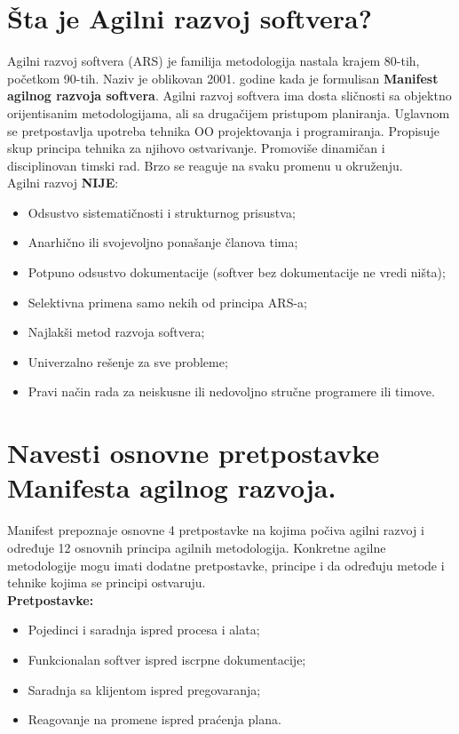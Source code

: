 \documentclass[a4paper]{article}
\begin{document}
\section{Šta je Agilni razvoj softvera?}
  Agilni razvoj softvera (ARS) je familija metodologija nastala krajem 80-tih, početkom 90-tih.
  Naziv je oblikovan 2001. godine kada je formulisan \textbf{Manifest agilnog razvoja softvera}. 
  Agilni  razvoj softvera ima dosta sličnosti sa objektno orijentisanim metodologijama, ali sa
  drugačijem pristupom planiranja. Uglavnom se pretpostavlja upotreba tehnika OO projektovanja i
  programiranja. Propisuje skup principa tehnika za njihovo ostvarivanje. Promoviše dinamičan 
  i disciplinovan timski rad. Brzo se reaguje na svaku promenu u okruženju.
  \cite{agilemanifesto}\cite{ss_agile_manifesto}\\
  Agilni razvoj \textbf{NIJE}:
  \begin{itemize}
    \item Odsustvo sistematičnosti i strukturnog prisustva;
    \item Anarhično ili svojevoljno ponašanje članova tima;
    \item Potpuno odsustvo dokumentacije (softver bez dokumentacije ne vredi ništa);
    \item Selektivna primena samo nekih od principa ARS-a;
    \item Najlakši metod razvoja softvera;
    \item Univerzalno rešenje za sve probleme;
    \item Pravi način rada za neiskusne ili nedovoljno stručne programere ili timove.
  \end{itemize}

\section{Navesti osnovne pretpostavke Manifesta agilnog razvoja.}
  Manifest prepoznaje osnovne 4 pretpostavke na kojima počiva agilni razvoj i određuje 12 osnovnih
  principa agilnih metodologija. Konkretne agilne metodologije mogu imati dodatne pretpostavke, 
  principe i da određuju metode i tehnike kojima se principi ostvaruju. \\
  \textbf{Pretpostavke:}
  \begin{itemize}
    \item Pojedinci i saradnja ispred procesa i alata;
    \item Funkcionalan softver ispred iscrpne dokumentacije;
    \item Saradnja sa klijentom ispred pregovaranja;
    \item Reagovanje na promene ispred praćenja plana.
  \end{itemize}
\end{document}
